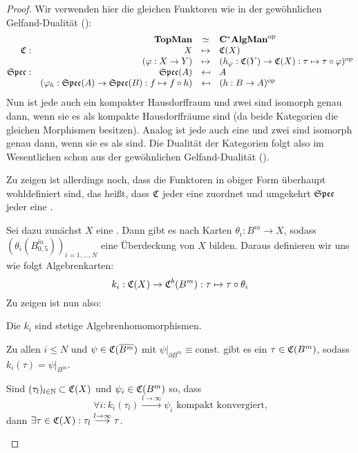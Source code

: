 \begin{proof}Wir verwenden hier die gleichen Funktoren wie in der gewöhnlichen Gelfand-Dualität ():
	\[\begin{array}{@{}rrcl@{}}
	 			&\KatTopMan			&\simeq		&\KatCAlgMan^\op 												\\
	\stetig: 	&X					&\mapsto	&\stetig(X)													\\
				&(\varphi:X \to Y)	&\mapsto	&(h_\varphi: \stetig(Y) \to \stetig(X): \tau \mapsto \tau \circ \varphi)^\op 		\\
	\SpecC:		&\SpecC(\A)													&\mapsfrom	&\A				\\
				&(\varphi_h: \SpecC(\A) \to \SpecC(\B): f \mapsto f \circ h)	&\mapsfrom	&(h: \B \to \A)^\op
	\end{array}\]
Nun ist jede \komTopMan{} auch ein kompakter Hausdorffraum und zwei \komenTopMan{} sind isomorph genau dann, wenn sie es als kompakte Hausdorffräume sind (da beide Kategorien die gleichen Morphismen besitzen). Analog ist jede \CAlgMan{} auch eine \CAlg{} und zwei \CAlgMann{} sind isomorph genau dann, wenn sie es als \CAlgn{} sind. Die Dualität der Kategorien folgt also im Wesentlichen schon aus der gewöhnlichen Gelfand-Dualität ().

Zu zeigen ist allerdings noch, dass die Funktoren in obiger Form überhaupt wohldefiniert sind, das heißt, dass $\mathfrak{C}$ jeder \komenTopMan{} eine \CAlgMan{} zuordnet und umgekehrt $\mathfrak{Spec}$ jeder \CAlgMan{} eine \komTopMan{}.

Sei dazu zunächst $X$ eine \komTopMan{}. Dann gibt es nach  Karten $\theta_i: B^m \to X$, sodass $(\theta_i(\overline{B_{0,5}^m}))_{i=1,\dots,N}$ eine Überdeckung von $X$ bilden. Daraus  definieren wir uns wie folgt Algebrenkarten:
	\[k_i: \mathfrak{C}(X) \to \mathfrak{C}^b(B^m): \tau \mapsto \tau \circ \theta_i \]
Zu zeigen ist nun also:
\begin{proofenum}
	\item \label{proof:GD2:kAlghom}
		Die $k_i$ sind stetige Algebrenhomomorphismen.
	\item \label{proof:GD2:schwachsurj}
		Zu allen $i \leq N$ und $\psi \in \mathfrak{C}(\overline{B^m})$ mit $\psi|_{\partial B^m} \equiv \mathrm{const.}$ gibt es ein $\tau \in \mathfrak{C}(B^m)$, sodass $k_i(\tau) = \psi|_{B^m}$.
	\item \label{proof:GD2:komkonv}
		Sind $(\tau_l)_{l \in \mathbb{N}} \subset \mathfrak{C}(X)$ und $\psi_i \in \mathfrak{C}(B^m)$ so, dass
			\[\forall i: k_i(\tau_l) \overset{l \to \infty}{\longrightarrow} \psi_i \text{ kompakt konvergiert,}\]
		dann $\exists \tau \in \mathfrak{C}(X): \tau_l \overset{l \to \infty}{\longrightarrow} \tau$.
	\setcounter{temp}{\value{proofenumi}}
\end{proofenum}


\end{proof}
